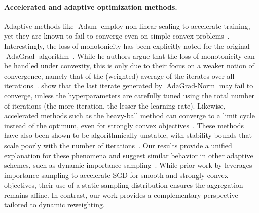 \documentclass[twoside,11pt]{article}
\let\todo\relax%
\newcommand{\comm}[3][inline]{\todo[#1, size=\tiny]{#2: #3}}
\newcommand{\autodo}[2][inline]{\comm[color=green,#1]{AB}{#2}}
\begin{document}
\paragraph{Accelerated and adaptive optimization methods.}
Adaptive methods like $\operatorname{Adam}$ \citep{kingma2017adammethodstochasticoptimization} employ non-linear scaling to accelerate training, yet they are known to fail to converge even on simple convex problems~\citep{reddi2018convergenceadam,luoadaptive,zhang2022adam}. 
Interestingly, the loss of monotonicity has been explicitly noted for the original $\operatorname{AdaGrad}$ algorithm~\citep[Example 1]{li2019convergence}.
While he authors argue that the loss of monotonicity can be handled under convexity, this is only due to their focus on a weaker notion of convergence, namely that of the (weighted) average of the iterates over all iterations~\citet[Theorem 3]{li2019convergence}.
\citet[][Theorem 2.3 and references therein]{preobrazhenskaia2026last-iterate-adagrad} show that the last iterate generated by $\operatorname{AdaGrad-Norm}$ may fail to converge, unless the hyperparameters are carefully tuned using the total number of iterations (the more iteration, the lesser the learning rate).
Likewise, accelerated methods such as the heavy-ball method can converge to a limit cycle instead of the optimum, even for strongly convex objectives~\citep[Figure 6]{heavy-ball-limit-cycle}.
These methods have also been shown to be algorithmically unstable, with stability bounds that scale poorly with the number of iterations~\citep{wilson2017marginal,attia2021algorithmic,JMLR:v25:22-0068stabilitymomentum,sun2024understanding}.
Our results provide a unified explanation for these phenomena and suggest similar behavior in other adaptive schemes, such as dynamic importance sampling~\citep{zhao2015stochastic}.
While prior work by \citet{needell2014stochastic-fixed-importance-sampling} leverages importance sampling to accelerate SGD for smooth and strongly convex objectives, their use of a static sampling distribution ensures the aggregation remains affine. 
In contrast, our work provides a complementary perspective tailored to dynamic reweighting.
\end{document}
